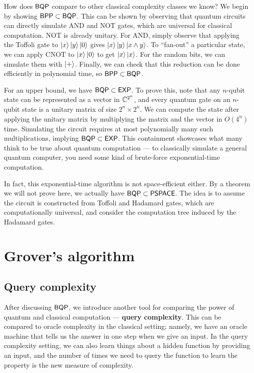 \documentclass[a4paper,draft]{article}
\begin{document}
How does $\operatorname{\mathsf{BQP}}$ compare to other classical complexity classes we know? We
begin by showing $\operatorname{\mathsf{BPP}} \subset \operatorname{\mathsf{BQP}}$. This can be shown by observing that
quantum circuits can directly simulate AND and NOT gates, which are
universal for classical computation. NOT is already unitary. For AND,
simply observe that applying the Toffoli gate to $\left\lvert x\right\rangle \left\lvert y\right\rangle
\left\lvert 0\right\rangle$ gives $\left\lvert x\right\rangle \left\lvert y\right\rangle \left\lvert x \wedge y\right\rangle$. To ``fan-out'' a
particular state, we can apply CNOT to $\left\lvert x\right\rangle \left\lvert 0\right\rangle$ to get
$\left\lvert x\right\rangle \left\lvert x\right\rangle$. For the random bits, we can simulate them with
$\left\lvert +\right\rangle$. Finally, we can check that this reduction can be done
efficiently in polynomial time, so $\operatorname{\mathsf{BPP}} \subset \operatorname{\mathsf{BQP}}$.

For an upper bound, we have $\operatorname{\mathsf{BQP}} \subset \operatorname{\mathsf{EXP}}$. To prove this, note that
any $n$-qubit state can be represented as a vector in $\mathbb{C}^{2^n}$, and
every quantum gate on an $n$-qubit state is a unitary matrix of size $2^n
\times 2^n$. We can compute the state after applying the unitary matrix by
multiplying the matrix and the vector in $O(4^n)$ time. Simulating the
circuit requires at most polynomially many such multiplications, implying
$\operatorname{\mathsf{BQP}} \subset \operatorname{\mathsf{EXP}}$. This containment showcases what many think to be true
about quantum computation — to classically simulate a general quantum
computer, you need some kind of brute-force exponential-time computation.

In fact, this exponential-time algorithm is not space-efficient either. By
a theorem we will not prove here, we actually have $\operatorname{\mathsf{BQP}} \subset \operatorname{\mathsf{PSPACE}}$.
The idea is to assume the circuit is constructed from Toffoli and Hadamard
gates, which are computationally universal, and consider the computation
tree induced by the Hadamard gates.

\section{Grover's algorithm}

\subsection{Query complexity}

After discussing $\operatorname{\mathsf{BQP}}$, we introduce another tool for comparing the power
of quantum and classical computation — \textbf{query complexity}. This can
be compared to oracle complexity in the classical setting; namely, we have
an oracle machine that tells us the answer in one step when we give an
input. In the query complexity setting, we can also learn things about a
hidden function by providing an input, and the number of times we need to
query the function to learn the property is the new measure of complexity.
\end{document}

